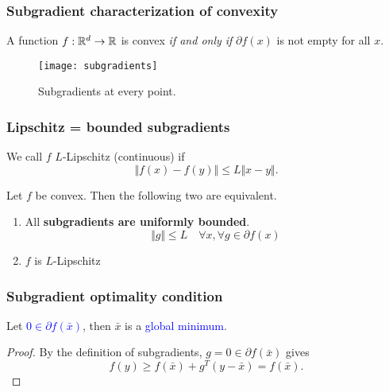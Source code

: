 \documentclass{beamer}
\begin{document}
\begin{frame}
  \frametitle{Subgradient characterization of convexity}
  \begin{lemma}%
    A function $f: \mathbb{R}^d \to \mathbb{R}$ is convex \textit{if and only if} $\partial f(x)$ is not empty for all $x$.
  \end{lemma}
  \begin{figure}[ht]
    \centering
    \texttt{[image: subgradients]}
    \caption{Subgradients at every point.}
  \end{figure}
\end{frame}

\begin{frame}
  \frametitle{Lipschitz = bounded subgradients}
  \begin{definition}
    We call $f$ $L$-Lipschitz (continuous) if
    \begin{equation}
      \Vert f(x)-f(y) \Vert \le L \Vert x-y \Vert.
    \end{equation}
  \end{definition}
  \begin{lemma}%
    Let $f$ be convex. Then the following two are equivalent.
    \begin{enumerate}
      \item All \textbf{subgradients are uniformly bounded}.
            \begin{equation}
              \Vert g \Vert \le L \quad \forall x, \forall g \in \partial f(x)
            \end{equation}
      \item $f$ is $L$-Lipschitz
    \end{enumerate}
  \end{lemma}
\end{frame}

\begin{frame}
  \frametitle{Subgradient optimality condition}
  \begin{lemma}%
    Let \textcolor{blue}{$0 \in \partial f(\bar{x})$}, then $\bar{x}$ is a \textcolor{blue}{global minimum}.
  \end{lemma}
  \begin{proof}
    By the definition of subgradients, $g=0 \in \partial f(\bar{x})$ gives
    \begin{equation}
      f(y) \ge f(\bar{x}) + g^T(y-\bar{x}) = f(\bar{x}).
    \end{equation}
  \end{proof}
\end{frame}
\end{document}

